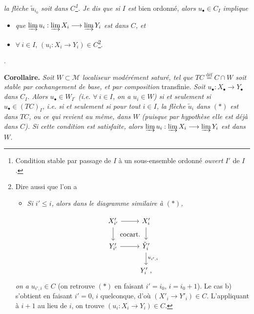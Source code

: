 \documentclass[11pt]{article}
\newcommand{\printedpage}[1]{\marginpar{\footnotesize p.~#1}}
\newcommand{\msp}[1]{\marginpar{\footnotesize [#1]}}
\begin{document}
\textit{la flèche $\tilde{u}_{i_0}$ soit dans $C$\footnote{Condition stable par passage de $I$ à un sous-ensemble ordonné \textit{ouvert} $I'$ de $I$.}. Je dis que si $I$ est} bien ordonné, \textit{alors $u_\bullet \in C_I$ implique}
\begin{itemize}[leftmargin=2.5em]
\item[a)] \textit{que $\varinjlim u_i : \varinjlim X_i \longrightarrow \varinjlim Y_i$ est dans $C$, et}
\item[b)] $\forall\ i \in I$, $(u_i : X_i \longrightarrow Y_i) \in C$\footnote{Dire aussi que l'on a
\begin{itemize}[leftmargin=2em]
\item[b$'$)] \textit{Si $i' \leq i$, alors dans le diagramme similaire à $(*)$,}
\end{itemize}
\[
\begin{tikzcd}
X'_{i'} \arrow[r] \arrow[d] \arrow[dr, phantom, "\text{cocart.}"] & X'_i \arrow[d] \\
Y'_{i'} \arrow[r] & \tilde{Y}'_i \arrow[d, "u_{i',i}"] \\
& Y'_i\ ,
\end{tikzcd}
\]
\textit{on a} $u_{i',i} \in C$ (on retrouve $(*)$ en faisant $i' = i_0$, $i = i_0 + 1$). Le cas b) s'obtient en faisant $i' = 0$, $i$ quelconque, d'où $(X'_i \longrightarrow Y'_i) \in C$. L'appliquant à $i+1$ au lieu de $i$, on trouve $(u_i : X_i \longrightarrow Y_i) \in C$.}.
\end{itemize}

. %

\textbf{Corollaire.} \textit{Soit $W \subset \mathcal{M}$ localiseur modérément saturé, tel que $TC \overset{\text{déf}}{=} C \cap W$ soit stable par cochangement de base, et par composition} transfinie. \textit{Soit $u_\bullet : X_\bullet \longrightarrow Y_\bullet$ dans $C_I$. Alors $u_\bullet \in W_{I^{\circ}}$ (i.e. $\forall\ i \in I$, on a $u_i \in W$) si et seulement si $u_\bullet \in (TC)_I$, i.e. si et seulement si pour tout $i \in I$, la flèche $\tilde{u}_i$ dans $(*)$ est dans $TC$, ou ce qui}
\msp{page 2: none}
\printedpage{2}
\msp{page 3}
\textit{revient au même, dans $W$ (puisque par hypothèse elle est déjà dans $C$). Si cette condition est satisfaite, alors $\varinjlim u_i : \varinjlim X_i \longrightarrow \varinjlim Y_i$ est dans $W$.}

\end{document}
